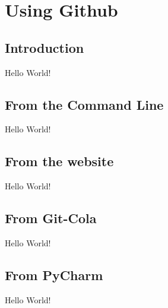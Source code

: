 \documentclass{article}
\begin{document}
\section{Using Github}
\subsection{Introduction}
Hello World!
\subsection{From the Command Line}
Hello World!
\subsection{From the website}
Hello World!
\subsection{From Git-Cola}
Hello World!
\subsection{From PyCharm}
Hello World!
\end{document}
